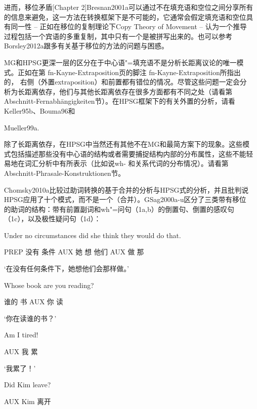 进而，移位矛盾[Chapter 2]Bresnan2001a可以通过不在填充语和空位之间分享所有的信息来避免，这一方法在转换框架下是不可能的，它通常会假定填充语和空位具有同一性 -- 正如在移位的复制理论下Copy Theory of Movement -- 认为一个推导过程包括一个宾语的多重复制，其中只有一个是被拼写出来的。也可以参考Borsley2012a跟多有关基于移位的方法的问题与困惑。







MG和HPSG更深一层的区分在于中心语"=填充语不是分析长距离议论的唯一模式。正如在第 fn-Kayne-Extraposition页的脚注 fn-Kayne-Extraposition所指出的， 右侧（外置extraposition）和前置都有错位的情况。尽管这些问题一定会分析为长距离依存，他们与其他长距离依存在很多方面都有不同之处（请看第 Abschnitt-Fernabhängigkeiten节）。在HPSG框架下的有关外置的分析，请看Keller95b、Bouma96和

Mueller99a. 









除了长距离依存，在HPSG中当然还有其他不在MG和最简方案下的现象。这些模式包括描述那些没有中心语的结构或者需要捕捉结构内部的分布属性，这些不能轻易地在词汇分析中有所表示（比如说wh- 和关系代词的分布情况）。请看第 Abschnitt-Phrasale-Konstruktionen节。





Chomsky2010a比较过助词转换的基于合并的分析与HPSG式的分析，并且批判说HPSG应用了十个模式，而不是一个（合并）。GSag2000a-u区分了三类带有移位的助词的结构：带有前置副词和wh"=问句（1a,b）的倒置句、倒置的感叹句（1c），以及极性疑问句（1d）：







Under no circumstances did she think they would do that.

PREP 没有 条件 AUX 她 想 他们 AUX 做 那

`在没有任何条件下，她想他们会那样做。'

Whose book are you reading?

谁的 书 AUX 你 读

`你在读谁的书？'

Am I tired!

AUX 我 累

`我累了！'

Did Kim leave?

AUX Kim 离开


